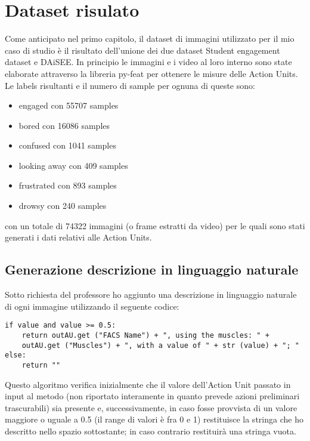\chapter{Dataset risulato}
Come anticipato nel primo capitolo, il dataset di immagini utilizzato per il mio caso di studio è il risultato dell’unione dei due dataset Student engagement dataset\cite{StudEngagDataset} e DAiSEE\cite{DAiSEE}.
In principio le immagini e i video al loro interno sono state elaborate attraverso la libreria py-feat per ottenere le misure delle Action Units.
Le labels risultanti e il numero di sample per ognuna di queste sono:
\begin{itemize}
\item engaged con 55707 samples
\item bored con 16086 samples
\item confused con 1041 samples
\item looking away con 409 samples
\item frustrated con 893 samples
\item drowsy con 240 samples
\end{itemize}

con un totale di 74322 immagini (o frame estratti da video) per le quali sono stati generati i dati relativi alle Action Units.


\section{Generazione descrizione in linguaggio naturale}
Sotto richiesta del professore ho aggiunto una descrizione in linguaggio naturale di ogni immagine utilizzando il seguente codice:
\begin{verbatim}
if value and value >= 0.5:
    return outAU.get ("FACS Name") + ", using the muscles: " + 
    outAU.get ("Muscles") + ", with a value of " + str (value) + "; "
else:
    return ""
\end{verbatim}
Questo algoritmo verifica inizialmente che il valore dell’Action Unit passato in input al metodo (non riportato interamente in quanto prevede azioni preliminari trascurabili) sia presente e, successivamente, in caso fosse provvista di un valore maggiore o uguale a 0.5 (il range di valori è fra 0 e 1) restituisce la stringa che ho descritto nello spazio sottostante; in caso contrario restituirà una stringa vuota.
